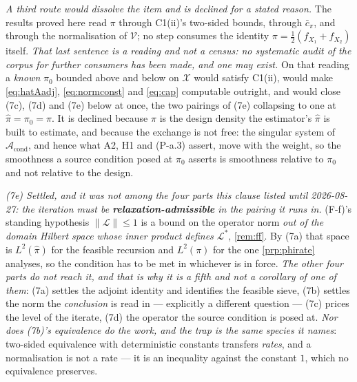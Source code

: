 \begin{remark}
\emph{A third route would dissolve the item and is declined for a stated reason.} The results proved
here read $\pi$ through C1(ii)'s two-sided bounds, through $\bar c_\pi$, and through the normalisation
of $\mathcal V$; no step consumes the identity $\pi=\tfrac12(f_{X_1}+f_{X_2})$ itself. \emph{That last
sentence is a reading and not a census: no systematic audit of the corpus for further consumers has been
made, and one may exist.} On that reading a \emph{known} $\pi_0$ bounded above and below on $\mathcal X$
would satisfy C1(ii), would make \eqref{eq:hatAadj}, \eqref{eq:normconst} and \eqref{eq:cap} computable
outright, and would close \textup{(7c)}, \textup{(7d)} and \textup{(7e)} below at once, the two pairings
of \textup{(7e)} collapsing to one at $\hat\pi=\pi_0=\pi$. It is declined because $\pi$ is the design density the
estimator's $\hat\pi$ is built to estimate, and because the exchange is not free: the singular system of
$\mathcal A_{\mathrm{cond}}$, and hence what A2, H1 and (P-a.3) assert, move with the weight, so the
smoothness a source condition posed at $\pi_0$ asserts is smoothness relative to $\pi_0$ and not
relative to the design.

\emph{(7e) Settled, and it was not among the four parts this clause listed until 2026-08-27: the
iteration must be \textbf{relaxation-admissible} in the pairing it runs in.} \textup{(F-f)}'s standing
hypothesis $\|\mathcal L\|\le1$ is a bound on the operator norm \emph{out of the domain Hilbert space
whose inner product defines $\mathcal L^{\ast}$}, \cref{rem:ff}. By \textup{(7a)} that space is
$L^{2}(\hat\pi)$ for the feasible recursion and $L^{2}(\pi)$ for the one \cref{prp:phirate} analyses, so
the condition has to be met in whichever is in force. \emph{The other four parts do not reach it, and
that is why it is a fifth and not a corollary of one of them}: \textup{(7a)} settles the adjoint
identity and identifies the feasible sieve, \textup{(7b)} settles the norm the \emph{conclusion} is read
in --- explicitly a different question --- \textup{(7c)} prices the level of the iterate, \textup{(7d)}
the operator the source condition is posed at. \emph{Nor does \textup{(7b)}'s equivalence do the work,
and the trap is the same species it names}: two-sided equivalence with deterministic constants
transfers \emph{rates}, and a normalisation is not a rate --- it is an inequality against the constant
$1$, which no equivalence preserves.


\end{remark}
